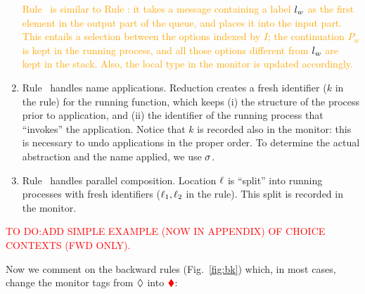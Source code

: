 \documentclass[runningheads]{llncs}
\newcommand{\todo}[1]{\textcolor{red}{TO DO:#1}}
\newcommand{\erase}[1]{\textcolor{orange}{#1}}
\begin{document}
\begin{enumerate}[$\fwcolor{\blacktriangleright}$]
\erase{Rule~ is similar to Rule \fwcolor{\textsc{(Sel)}}: it takes a message containing a label $l_w$ as the first element in the output part of the queue, and places it into the input part. This entails a selection between the options indexed by $I$; the continuation $P_w$ is kept in the running process, and all those options different from $l_w$ are kept in the stack. Also, the local type in the monitor is updated accordingly.
}
\item Rule~ handles name applications. Reduction  creates a fresh identifier ($k$ in the rule) for the running function, which keeps (i) the structure of the process prior to application, and (ii) the identifier of the running process that ``invokes'' the application. Notice that $k$ is recorded also in the monitor: this is necessary to undo applications in the proper order. To determine the actual abstraction and the name applied, we use   $\sigma$.

\item Rule~ handles parallel composition. Location $\ell$ is ``split'' into running processes with fresh identifiers ($\ell_1, \ell_2$ in the rule). This split is recorded in the   monitor.
\end{enumerate}


\todo{ADD SIMPLE EXAMPLE (NOW IN APPENDIX) OF CHOICE CONTEXTS (FWD ONLY).}

\noindent
Now we comment on the backward rules (Fig.~\ref{fig:bk}) which, in most cases, change the monitor tags from $\lozenge$ into $\textcolor{red}{\blacklozenge}$:
\end{document}
